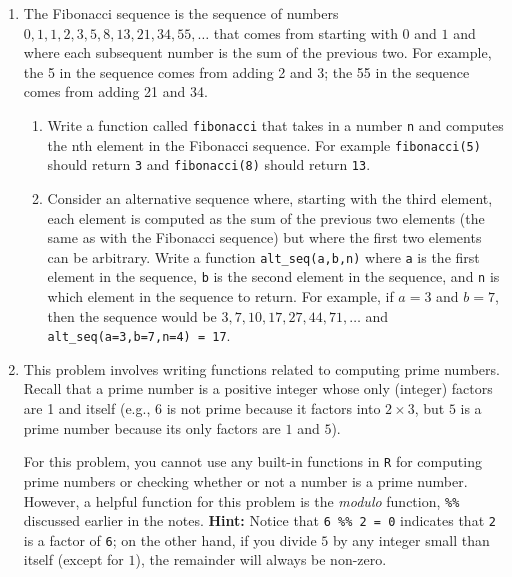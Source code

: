 \documentclass[
  letterpaper,
  DIV=11,
  numbers=noendperiod]{scrreprt}
\begin{document}
\begin{enumerate}
  Try out all three approaches that you came up with above for
  \(n=100\). What is the answer? Do you get the same answer using all
  three approaches?
\item
  The Fibonacci sequence is the sequence of numbers
  \(0,1,1,2,3,5,8,13,21,34,55,\ldots\) that comes from starting with
  \(0\) and \(1\) and where each subsequent number is the sum of the
  previous two. For example, the 5 in the sequence comes from adding 2
  and 3; the 55 in the sequence comes from adding 21 and 34.

  \begin{enumerate}
  \def\labelenumii{\alph{enumii})}
  \item
    Write a function called \texttt{fibonacci} that takes in a number
    \texttt{n} and computes the nth element in the Fibonacci sequence.
    For example \texttt{fibonacci(5)} should return \texttt{3} and
    \texttt{fibonacci(8)} should return \texttt{13}.
  \item
    Consider an alternative sequence where, starting with the third
    element, each element is computed as the sum of the previous two
    elements (the same as with the Fibonacci sequence) but where the
    first two elements can be arbitrary. Write a function
    \texttt{alt\_seq(a,b,n)} where \texttt{a} is the first element in
    the sequence, \texttt{b} is the second element in the sequence, and
    \texttt{n} is which element in the sequence to return. For example,
    if \(a=3\) and \(b=7\), then the sequence would be
    \(3,7,10,17,27,44,71,\ldots\) and
    \texttt{alt\_seq(a=3,b=7,n=4)\ =\ 17}.
  \end{enumerate}
\item
  This problem involves writing functions related to computing prime
  numbers. Recall that a prime number is a positive integer whose only
  (integer) factors are 1 and itself (e.g., \(6\) is not prime because
  it factors into \(2\times 3\), but \(5\) is a prime number because its
  only factors are \(1\) and \(5\)).

  For this problem, you cannot use any built-in functions in \texttt{R}
  for computing prime numbers or checking whether or not a number is a
  prime number. However, a helpful function for this problem is the
  \emph{modulo} function, \texttt{\%\%} discussed earlier in the notes.
  \textbf{Hint:} Notice that \texttt{6\ \%\%\ 2\ =\ 0} indicates that
  \texttt{2} is a factor of \texttt{6}; on the other hand, if you divide
  \(5\) by any integer small than itself (except for \(1\)), the
  remainder will always be non-zero.


\end{enumerate}
\end{document}

